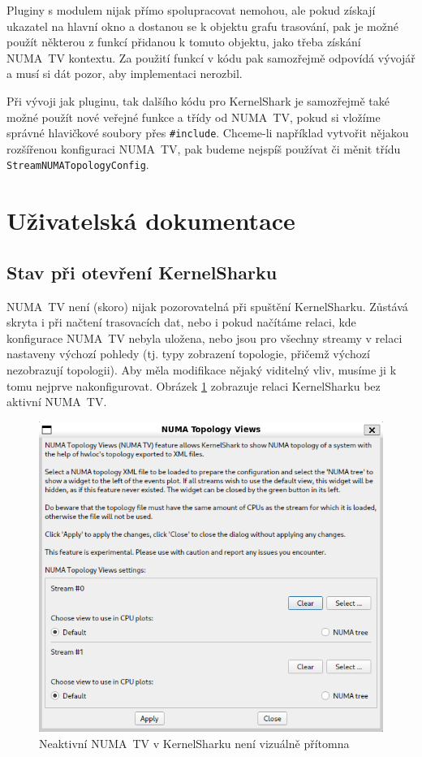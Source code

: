 Pluginy s modulem nijak přímo spolupracovat nemohou, ale pokud získají ukazatel na hlavní okno a dostanou se k objektu grafu trasování, pak je možné použít některou z funkcí přidanou k tomuto objektu, jako třeba získání NUMA~TV kontextu. Za použití funkcí v kódu pak samozřejmě odpovídá vývojář a musí si dát pozor, aby implementaci nerozbil.

Při vývoji jak pluginu, tak dalšího kódu pro KernelShark je samozřejmě také možné použít nové veřejné funkce a třídy od NUMA~TV, pokud si vložíme správné hlavičkové soubory přes \texttt{\#include}. Chceme-li například vytvořit nějakou rozšířenou konfiguraci NUMA~TV, pak budeme nejspíš používat či měnit třídu \texttt{StreamNUMATopologyConfig}. 

\section{Uživatelská dokumentace}

\subsection{Stav při otevření KernelSharku}

NUMA~TV není (skoro) nijak pozorovatelná při spuštění KernelSharku. Zůstává skryta i při načtení trasovacích dat, nebo i pokud načítáme relaci, kde konfigurace NUMA~TV nebyla uložena, nebo jsou pro všechny streamy v relaci nastaveny výchozí pohledy (tj. typy zobrazení topologie, přičemž výchozí nezobrazují topologii). Aby měla modifikace nějaký viditelný vliv, musíme ji k tomu nejprve nakonfigurovat. Obrázek \ref{numatv-2} zobrazuje relaci KernelSharku bez aktivní NUMA~TV.

\begin{figure}[p]\centering
    \includegraphics[width=140mm]{img/NUMATV/numatv-2}
    \caption{Neaktivní NUMA~TV v KernelSharku není vizuálně přítomna}
    \label{numatv-2}
\end{figure}

